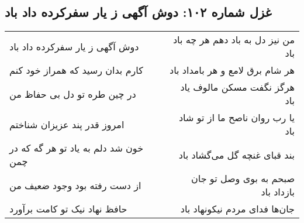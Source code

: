 \begin{center}
\section*{غزل شماره ۱۰۲: دوش آگهی ز یار سفرکرده داد باد}
\label{sec:sh102}
\begin{longtable}{l p{0.5cm} r}
دوش آگهی ز یار سفرکرده داد باد
&&
من نیز دل به باد دهم هر چه باد باد
\\
کارم بدان رسید که همراز خود کنم
&&
هر شام برق لامع و هر بامداد باد
\\
در چین طره تو دل بی حفاظ من
&&
هرگز نگفت مسکن مالوف یاد باد
\\
امروز قدر پند عزیزان شناختم
&&
یا رب روان ناصح ما از تو شاد باد
\\
خون شد دلم به یاد تو هر گه که در چمن
&&
بند قبای غنچه گل می‌گشاد باد
\\
از دست رفته بود وجود ضعیف من
&&
صبحم به بوی وصل تو جان بازداد باد
\\
حافظ نهاد نیک تو کامت برآورد
&&
جان‌ها فدای مردم نیکونهاد باد
\\
\end{longtable}
\end{center}

